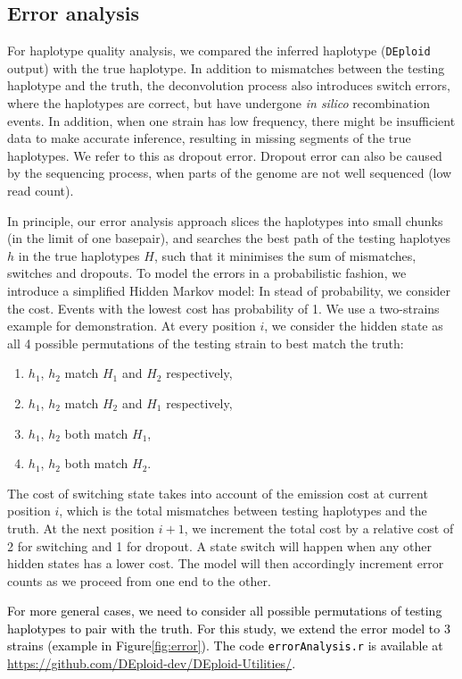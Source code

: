 \documentclass[9pt]{article}
\begin{document}
\subsection{Error analysis}
For haplotype quality analysis, we compared the inferred haplotype ({\tt DEploid} output) with the true haplotype. In addition to mismatches between the testing haplotype and the truth, the deconvolution process also introduces switch errors, where the haplotypes are correct, but have undergone {\it in silico} recombination events. In addition, when one strain has low frequency, there might be insufficient data to make accurate inference, resulting in missing segments of the true haplotypes. We refer to this as dropout error. Dropout error can also be caused by the sequencing process, when parts of the genome are not well sequenced (low read count). 

In principle, our error analysis approach slices the haplotypes into small chunks (in the limit of one basepair), and searches the best path of the testing haplotyes $h$ in the true haplotypes $H$, such that it minimises the sum of mismatches, switches and dropouts. To model the errors in a probabilistic fashion, we introduce a simplified Hidden Markov model: In stead of probability, we consider the cost. Events with the lowest cost has probability of 1. We use a two-strains example for demonstration. At every position $i$, we consider the hidden state as all 4 possible permutations of the testing strain to best match the truth:
\begin{enumerate}
  \item $h_{1}$, $h_{2}$ match $H_{1}$ and $H_{2}$ respectively,
  \item $h_{1}$, $h_{2}$ match $H_{2}$ and $H_{1}$ respectively,
  \item $h_{1}$, $h_{2}$ both match $H_{1}$,
  \item $h_{1}$, $h_{2}$ both match $H_{2}$.
\end{enumerate}
The cost of switching state takes into account of the emission cost at current position $i$, which is the total mismatches between testing haplotypes and the truth. At the next position $i+1$, we increment the total cost by a relative cost of 2 for switching and 1 for dropout. A state switch will happen when any other hidden states has a lower cost. The model will then accordingly increment error counts as we proceed from one end to the other.

\textcolor{black}{For more general cases, we need to consider all possible permutations of testing haplotypes to pair with the truth. For this study, we extend the error model to 3 strains (example in Figure\ref{fig:error}). The code {\tt errorAnalysis.r} is available at \url{https://github.com/DEploid-dev/DEploid-Utilities/}.}
\end{document}
